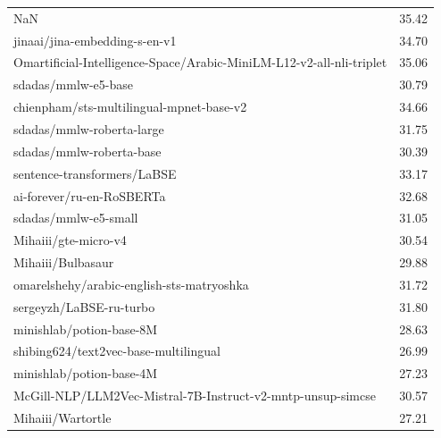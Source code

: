 \begin{xltabular}{\textwidth}{X c}
    NaN                                                                  & 35.42                    \\
    jinaai/jina-embedding-s-en-v1                                        & 34.70                    \\
    Omartificial-Intelligence-Space/Arabic-MiniLM-L12-v2-all-nli-triplet & 35.06                    \\
    sdadas/mmlw-e5-base                                                  & 30.79                    \\
    chienpham/sts-multilingual-mpnet-base-v2                             & 34.66                    \\
    sdadas/mmlw-roberta-large                                            & 31.75                    \\
    sdadas/mmlw-roberta-base                                             & 30.39                    \\
    sentence-transformers/LaBSE                                          & 33.17                    \\
    ai-forever/ru-en-RoSBERTa                                            & 32.68                    \\
    sdadas/mmlw-e5-small                                                 & 31.05                    \\
    Mihaiii/gte-micro-v4                                                 & 30.54                    \\
    Mihaiii/Bulbasaur                                                    & 29.88                    \\
    omarelshehy/arabic-english-sts-matryoshka                            & 31.72                    \\
    sergeyzh/LaBSE-ru-turbo                                              & 31.80                    \\
    minishlab/potion-base-8M                                             & 28.63                    \\
    shibing624/text2vec-base-multilingual                                & 26.99                    \\
    minishlab/potion-base-4M                                             & 27.23                    \\
    McGill-NLP/LLM2Vec-Mistral-7B-Instruct-v2-mntp-unsup-simcse          & 30.57                    \\
    Mihaiii/Wartortle                                                    & 27.21                    \\

\end{xltabular}
